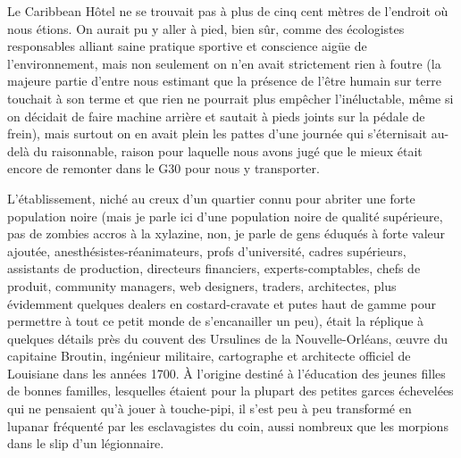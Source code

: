 Le Caribbean Hôtel ne se trouvait pas à plus de cinq cent mètres de l’endroit où nous étions. On aurait pu y aller à pied, bien sûr, comme des écologistes responsables alliant saine pratique sportive et conscience aigüe de l’environnement, mais non seulement on n’en avait strictement rien à foutre (la majeure partie d’entre nous estimant que la présence de l’être humain sur terre touchait à son terme et que rien ne pourrait plus empêcher l’inéluctable, même si on décidait de faire machine arrière et sautait à pieds joints sur la pédale de frein), mais surtout on en avait plein les pattes d’une journée qui s’éternisait au-delà du raisonnable, raison pour laquelle nous avons jugé que le mieux était encore de remonter dans le G30 pour nous y transporter.

L’établissement, niché au creux d’un quartier connu pour abriter une forte population noire (mais je parle ici d’une population noire de qualité supérieure, pas de zombies accros à la xylazine, non, je parle de gens éduqués à forte valeur ajoutée, anesthésistes-réanimateurs, profs d’université, cadres supérieurs, assistants de production, directeurs financiers, experts-comptables, chefs de produit, community managers, web designers, traders, architectes, plus évidemment quelques dealers en costard-cravate et putes haut de gamme pour permettre à tout ce petit monde de s’encanailler un peu), était la réplique à quelques détails près du couvent des Ursulines de la Nouvelle-Orléans, œuvre du capitaine Broutin, ingénieur militaire, cartographe et architecte officiel de Louisiane dans les années 1700. À l’origine destiné à l’éducation des jeunes filles de bonnes familles, lesquelles étaient pour la plupart des petites garces échevelées qui ne pensaient qu’à jouer à touche-pipi, il s’est peu à peu transformé en lupanar fréquenté par les esclavagistes du coin, aussi nombreux que les morpions dans le slip d’un légionnaire.

